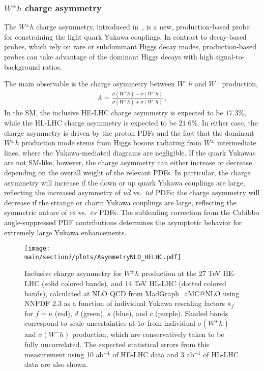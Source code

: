 \documentclass[../report.tex]{subfiles}
\providecommand{\main}{..}
\begin{document}
\subsubsection{$W^\pm h$ charge asymmetry}

The $W^\pm h$ charge asymmetry, introduced in~\cite{Yu:2016rvv}, is a
new, production-based probe for constraining the light quark Yukawa
couplings.  In contrast to decay-based probes, which rely on rare or
subdominant Higgs decay modes, production-based probes can take
advantage of the dominant Higgs decays with high signal-to-background
ratios.  

The main observable is the charge asymmetry between $W^+ h$ and $W^-$
production,
%
\begin{align}
	A 
= 	\frac{ \sigma (W^+ h) - \sigma (W^- h)}
	{\sigma (W^+ h) + \sigma (W^- h) } \, ,
\end{align}
%
In the SM, the inclusive HE-LHC charge asymmetry is expected to be $17.3\%$, while the HL-LHC charge asymmetry is expected to be $21.6\%$.  In either
case, the charge asymmetry is driven by the proton PDFs and the fact
that the dominant $W^\pm h$ production mode stems from Higgs bosons
radiating from $W^\pm$ intermediate lines, where the Yukawa-mediated
diagrams are negligible.  If the quark Yukawas are not SM-like,
however, the charge asymmetry can either increase or decrease,
depending on the overall weight of the relevant PDFs.  In particular,
the charge asymmetry will increase if the down or up quark Yukawa
couplings are large, reflecting the increased asymmetry of $u \bar{d}$
vs.~$\bar{u} d$ PDFs; the charge asymmetry will decrease if the
strange or charm Yukawa couplings are large, reflecting the symmetric
nature of $c \bar{s}$ vs.~$\bar{c} s$ PDFs.  The subleading correction
from the Cabibbo angle-suppressed PDF contributions determines the
asymptotic behavior for extremely large Yukawa enhancements.

\begin{figure}[tb!]
  \begin{center}
 \texttt{[image: \\main/section7/plots/AsymmetryNLO\_HELHC.pdf]}
 \caption{Inclusive charge asymmetry for $W^\pm h$ production at the
   27 TeV HE-LHC (solid colored bands), and 14 TeV HL-LHC (dotted
   colored bands), calculated at NLO QCD from MadGraph\_aMC@NLO using
   NNPDF 2.3 as a function of individual Yukawa rescaling factors
   $\bar{\kappa}_f$ for $f = u$ (red), $d$ (green), $s$ (blue), and
   $c$ (purple).  Shaded bands correspond to scale uncertainties at
   $1\sigma$ from individual $\sigma(W^+ h)$ and $\sigma(W^- h)$
   production, which are conservatively taken to be fully
   uncorrelated.  The expected statistical errors from this
   measurement using 10 ab$^{-1}$ of HE-LHC data and 3 ab$^{-1}$ of
   HL-LHC data are also shown.}
  \label{fig:asymmetry}
  \end{center}
\end{figure}
\end{document}
